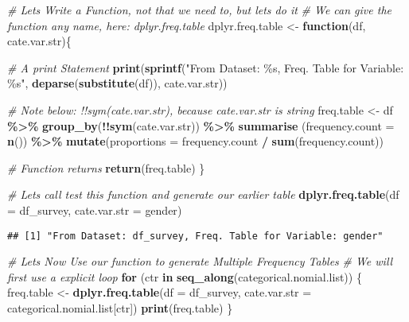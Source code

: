 \documentclass[
]{book}
\newenvironment{Shaded}{\begin{snugshade}}{\end{snugshade}}
\newcommand{\CommentTok}[1]{\textcolor[rgb]{0.56,0.35,0.01}{\textit{#1}}}
\newcommand{\ControlFlowTok}[1]{\textcolor[rgb]{0.13,0.29,0.53}{\textbf{#1}}}
\newcommand{\DataTypeTok}[1]{\textcolor[rgb]{0.13,0.29,0.53}{#1}}
\newcommand{\KeywordTok}[1]{\textcolor[rgb]{0.13,0.29,0.53}{\textbf{#1}}}
\newcommand{\NormalTok}[1]{#1}
\newcommand{\OperatorTok}[1]{\textcolor[rgb]{0.81,0.36,0.00}{\textbf{#1}}}
\newcommand{\StringTok}[1]{\textcolor[rgb]{0.31,0.60,0.02}{#1}}
\begin{document}
\begin{Shaded}
\begin{Highlighting}[]
\CommentTok{\# Let\textquotesingle{}s Write a Function, not that we need to, but let\textquotesingle{}s do it}
\CommentTok{\# We can give the function any name, here: dplyr.freq.table}
\NormalTok{dplyr.freq.table \textless{}{-}}\StringTok{ }\ControlFlowTok{function}\NormalTok{(df, cate.var.str)\{}

    \CommentTok{\# A print Statement}
    \KeywordTok{print}\NormalTok{(}\KeywordTok{sprintf}\NormalTok{(}\StringTok{"From Dataset: \%s, Freq. Table for Variable: \%s"}\NormalTok{, }\KeywordTok{deparse}\NormalTok{(}\KeywordTok{substitute}\NormalTok{(df)), cate.var.str))}

    \CommentTok{\# Note below: !!sym(cate.var.str), because cate.var.str is string}
\NormalTok{    freq.table \textless{}{-}}\StringTok{ }\NormalTok{df }\OperatorTok{\%\textgreater{}\%}
\StringTok{        }\KeywordTok{group\_by}\NormalTok{(}\OperatorTok{!!}\KeywordTok{sym}\NormalTok{(cate.var.str)) }\OperatorTok{\%\textgreater{}\%}
\StringTok{        }\KeywordTok{summarise}\NormalTok{ (}\DataTypeTok{frequency.count =} \KeywordTok{n}\NormalTok{()) }\OperatorTok{\%\textgreater{}\%}
\StringTok{        }\KeywordTok{mutate}\NormalTok{(}\DataTypeTok{proportions =}\NormalTok{ frequency.count }\OperatorTok{/}\StringTok{ }\KeywordTok{sum}\NormalTok{(frequency.count))}

    \CommentTok{\# Function returns}
    \KeywordTok{return}\NormalTok{(freq.table)}
\NormalTok{\}}

\CommentTok{\# Let\textquotesingle{}s call test this function and generate our earlier table}
\KeywordTok{dplyr.freq.table}\NormalTok{(}\DataTypeTok{df =}\NormalTok{ df\_survey, }\DataTypeTok{cate.var.str =} \StringTok{\textquotesingle{}gender\textquotesingle{}}\NormalTok{)}
\end{Highlighting}
\end{Shaded}

\begin{verbatim}
## [1] "From Dataset: df_survey, Freq. Table for Variable: gender"
\end{verbatim}

\begin{Shaded}
\begin{Highlighting}[]
\CommentTok{\# Let\textquotesingle{}s Now Use our function to generate Multiple Frequency Tables}
\CommentTok{\# We will first use a explicit loop}
\ControlFlowTok{for}\NormalTok{ (ctr }\ControlFlowTok{in} \KeywordTok{seq\_along}\NormalTok{(categorical.nomial.list)) \{}
\NormalTok{    freq.table \textless{}{-}}\StringTok{ }\KeywordTok{dplyr.freq.table}\NormalTok{(}\DataTypeTok{df =}\NormalTok{ df\_survey, }\DataTypeTok{cate.var.str =}\NormalTok{ categorical.nomial.list[ctr])}
    \KeywordTok{print}\NormalTok{(freq.table)}
\NormalTok{\}}
\end{Highlighting}
\end{Shaded}
\end{document}
